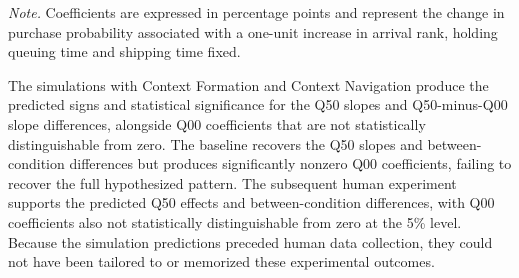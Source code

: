 \documentclass[12pt,letterpaper]{article}
\begin{document}
\begin{table}[htbp]
\centering
\begingroup
{}
\renewcommand{\arraystretch}{1.15}
\setlength{\tabcolsep}{6pt}

\caption{H2: Arrival Rank Effects in Human and
LLM Simulation Data}
\label{tab:decomposition-h2}


\medskip
\begin{minipage}{\textwidth}
\footnotesize
\textit{Note.} Coefficients are expressed in percentage points
and represent the change in purchase probability associated
with a one-unit increase in arrival rank, holding queuing time
and shipping time fixed.
\end{minipage}

\endgroup
\end{table}

The simulations with Context Formation and Context Navigation
produce the predicted signs and statistical significance for
the Q50 slopes and Q50-minus-Q00 slope differences, alongside
Q00 coefficients that are not statistically distinguishable
from zero. The baseline recovers the Q50 slopes and
between-condition differences but produces significantly
nonzero Q00 coefficients, failing to recover the full
hypothesized pattern. The subsequent human experiment supports
the predicted Q50 effects and between-condition differences,
with Q00 coefficients also not statistically distinguishable
from zero at the 5\% level. Because the simulation predictions
preceded human data collection, they could not have been
tailored to or memorized these experimental outcomes. 
\end{document}
